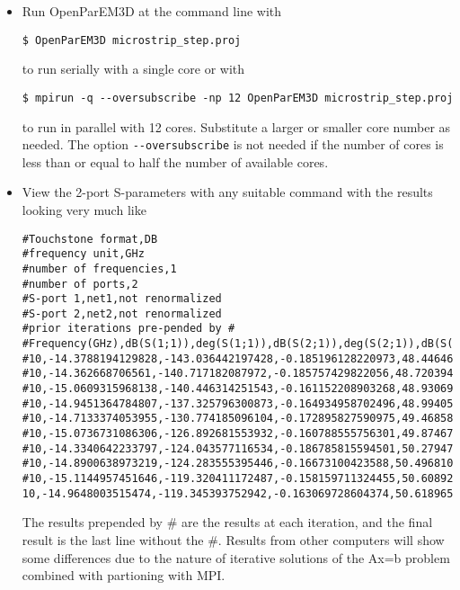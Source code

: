 \documentclass[titlepage]{article}
\renewcommand\_{\textunderscore\linebreak[1]}
\begin{document}
\begin{itemize}
\item Run OpenParEM3D at the command line with
\begin{Verbatim}[fontsize=\small]
   $ OpenParEM3D microstrip_step.proj
\end{Verbatim}
to run serially with a single core or with
\begin{Verbatim}[fontsize=\small]
   $ mpirun -q --oversubscribe -np 12 OpenParEM3D microstrip_step.proj
\end{Verbatim}
to run in parallel with 12 cores.  Substitute a larger or smaller core number as needed.  The option \verb+--oversubscribe+ is not needed if the number of cores is less than or equal to half the number of available cores.
\item View the 2-port S-parameters with any suitable command with the results looking very much like
\begin{Verbatim}[fontsize=\tiny]
#Touchstone format,DB
#frequency unit,GHz
#number of frequencies,1
#number of ports,2
#S-port 1,net1,not renormalized
#S-port 2,net2,not renormalized
#prior iterations pre-pended by #
#Frequency(GHz),dB(S(1;1)),deg(S(1;1)),dB(S(2;1)),deg(S(2;1)),dB(S(1;2)),deg(S(1;2)),dB(S(2;2)),deg(S(2;2))
#10,-14.3788194129828,-143.036442197428,-0.185196128220973,48.4464694369318,-0.185196128220973,48.4464694369318,-14.3755919817412,59.8969360333806
#10,-14.362668706561,-140.717182087972,-0.185757429822056,48.7203941057591,-0.185757429822056,48.7203941057591,-14.3605686334538,58.1152503635806
#10,-15.0609315968138,-140.446314251543,-0.161152208903268,48.9306989849119,-0.161152208903268,48.9306989849119,-15.0598550941328,58.2646381098206
#10,-14.9451364784807,-137.325796300873,-0.164934958702496,48.9940535036704,-0.164934958702496,48.9940535036704,-14.9442860056249,55.2642922102583
#10,-14.7133374053955,-130.774185096104,-0.172895827590975,49.4685808388707,-0.172895827590975,49.4685808388707,-14.7098431887646,49.664383434521
#10,-15.0736731086306,-126.892681553932,-0.160788555756301,49.8746771388686,-0.160788555756301,49.8746771388686,-15.0675315888474,46.6021770759152
#10,-14.3340642233797,-124.043577116534,-0.186785815594501,50.2794740952806,-0.186785815594501,50.2794740952806,-14.3297637712834,44.5637330342644
#10,-14.8900638973219,-124.283555395446,-0.16673100423588,50.4968103406548,-0.16673100423588,50.4968103406548,-14.8857288440341,45.2485990207109
#10,-15.1144957451646,-119.320411172487,-0.158159711324455,50.6089280321123,-0.158159711324455,50.6089280321123,-15.1098168809666,40.5542876526387
10,-14.9648003515474,-119.345393752942,-0.163069728604374,50.618965517188,-0.163069728604374,50.618965517188,-14.9590784928379,40.6098185523797
\end{Verbatim}
The results prepended by \# are the results at each iteration, and the final result is the last line without the \#.  Results from other computers will show some differences due to the nature of iterative solutions of the Ax=b problem combined with partioning with MPI.


\end{itemize}
\end{document}

